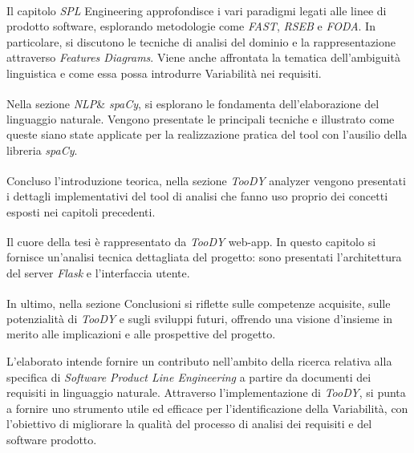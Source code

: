\documentclass[12pt]{report}
\newcommand{\myref}[1]{\textsuperscript{\hyperref[#1]{\ding{70}}}}
\newcommand{\toody}{\textsl{TooDY}\xspace}
\newcommand{\flask}{\textsl{Flask}\xspace}
\newcommand{\spacy}{\textsl{spaCy}\xspace}
\newcommand{\spl}{\textsl{SPL}\xspace}
\newcommand{\nlp}{\textsl{NLP}\xspace}
\begin{document}
\begin{mdframed}
\small
Il capitolo \textsf{\spl Engineering}\myref{ch:sple} approfondisce i vari paradigmi legati alle linee di prodotto software, esplorando metodologie come \textit{FAST}, \textit{RSEB} e \textit{FODA}. In particolare, si discutono le tecniche di analisi del dominio e la rappresentazione attraverso \textit{Features Diagrams}. Viene anche affrontata la tematica dell’ambiguità linguistica e come essa possa introdurre Variabilità nei requisiti.

\vspace{0.25cm}

Nella sezione \textsf{\nlp \& \spacy}\myref{ch:nlp}, si esplorano le fondamenta dell'elaborazione del linguaggio naturale. Vengono presentate le principali tecniche e illustrato come queste siano state applicate per la realizzazione pratica del tool con l'ausilio della libreria \spacy.

\vspace{0.25cm}

Concluso l'introduzione teorica, nella sezione \textsf{\toody analyzer}\myref{ch:parser} vengono presentati i dettagli implementativi del tool di analisi che fanno uso proprio dei concetti esposti nei capitoli precedenti.

\vspace{0.25cm}

Il cuore della tesi è rappresentato da \textsf{\toody web-app}\myref{ch:architettura}. In questo capitolo si fornisce un'analisi tecnica dettagliata del progetto: sono presentati l'architettura del server \flask e l’interfaccia utente.

\vspace{0.25cm}

In ultimo, nella sezione \textsf{Conclusioni}\myref{ch:conclusioni} si riflette sulle competenze acquisite, sulle potenzialità di \toody e sugli sviluppi futuri, offrendo una visione d'insieme in merito alle implicazioni e alle prospettive del progetto.
\end{mdframed}


\noindent L’elaborato intende fornire un contributo nell’ambito della ricerca relativa alla specifica di \textit{Software Product Line Engineering} a partire da documenti dei requisiti in linguaggio naturale. Attraverso l’implementazione di \toody, si punta a fornire uno strumento utile ed efficace per l’identificazione della Variabilità, con l’obiettivo di migliorare la qualità del processo di analisi dei requisiti e del software prodotto.
\end{document}
